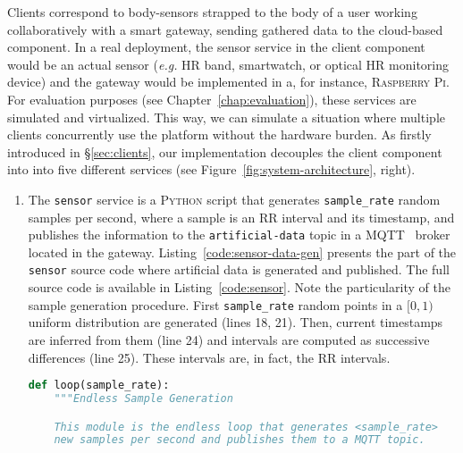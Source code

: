 Clients correspond to body-sensors strapped to the body of a user working collaboratively with a smart gateway, sending gathered data to the cloud-based component. 
In a real deployment, the sensor service in the client component would be an actual sensor (\textit{e.g.} HR band, smartwatch, or optical HR monitoring device) and the gateway would be implemented in a, for instance, \textsc{Raspberry Pi}.
For evaluation purposes (see Chapter~\ref{chap:evaluation}), these services are simulated and virtualized.
This way, we can simulate a situation where multiple clients concurrently use the platform without the hardware burden.
As firstly introduced in \S\ref{sec:clients}, our implementation decouples the client component into into five different services (see Figure~\ref{fig:system-architecture}, right). 
\begin{enumerate}
    \item The \texttt{sensor} service is a \textsc{Python} script that generates \texttt{sample\_rate} random samples per second, where a sample is an RR interval and its timestamp, and publishes the information to the \texttt{artificial-data} topic in a \textsc{MQTT}~\cite{mqtt-protocol} broker located in the gateway. Listing~\ref{code:sensor-data-gen} presents the part of the \texttt{sensor} source code where artificial data is generated and published. The full source code is available in Listing~\ref{code:sensor}. Note the particularity of the sample generation procedure. First \texttt{sample\_rate} random points in a $[0, 1)$ uniform distribution are generated (lines 18, 21). Then, current timestamps are inferred from them (line 24) and intervals are computed as successive differences (line 25). These intervals are, in fact, the RR intervals.
\begin{lstlisting}[language=Python,caption={Snippet illustrating the artificial data generation in the \texttt{sensor} service.},label=code:sensor-data-gen]
def loop(sample_rate):
    """Endless Sample Generation

    This module is the endless loop that generates <sample_rate>
    new samples per second and publishes them to a MQTT topic.


\end{lstlisting}
\end{enumerate}
